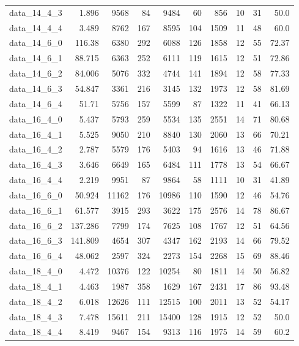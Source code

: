 \begin{tabular}{rrrrrrrrrr}
  data\_14\_4\_3 & 1.896 & 9568 & 84 & 9484 & 60 & 856 & 10 & 31 & 50.0 \\
  data\_14\_4\_4 & 3.489 & 8762 & 167 & 8595 & 104 & 1509 & 11 & 48 & 60.0 \\
  data\_14\_6\_0 & 116.38 & 6380 & 292 & 6088 & 126 & 1858 & 12 & 55 & 72.37 \\
  data\_14\_6\_1 & 88.715 & 6363 & 252 & 6111 & 119 & 1615 & 12 & 51 & 72.86 \\
  data\_14\_6\_2 & 84.006 & 5076 & 332 & 4744 & 141 & 1894 & 12 & 58 & 77.33 \\
  data\_14\_6\_3 & 54.847 & 3361 & 216 & 3145 & 132 & 1973 & 12 & 58 & 81.69 \\
  data\_14\_6\_4 & 51.71 & 5756 & 157 & 5599 & 87 & 1322 & 11 & 41 & 66.13 \\
  data\_16\_4\_0 & 5.437 & 5793 & 259 & 5534 & 135 & 2551 & 14 & 71 & 80.68 \\
  data\_16\_4\_1 & 5.525 & 9050 & 210 & 8840 & 130 & 2060 & 13 & 66 & 70.21 \\
  data\_16\_4\_2 & 2.787 & 5579 & 176 & 5403 & 94 & 1616 & 13 & 46 & 71.88 \\
  data\_16\_4\_3 & 3.646 & 6649 & 165 & 6484 & 111 & 1778 & 13 & 54 & 66.67 \\
  data\_16\_4\_4 & 2.219 & 9951 & 87 & 9864 & 58 & 1111 & 10 & 31 & 41.89 \\
  data\_16\_6\_0 & 50.924 & 11162 & 176 & 10986 & 110 & 1590 & 12 & 46 & 54.76 \\
  data\_16\_6\_1 & 61.577 & 3915 & 293 & 3622 & 175 & 2576 & 14 & 78 & 86.67 \\
  data\_16\_6\_2 & 137.286 & 7799 & 174 & 7625 & 108 & 1767 & 12 & 51 & 64.56 \\
  data\_16\_6\_3 & 141.809 & 4654 & 307 & 4347 & 162 & 2193 & 14 & 66 & 79.52 \\
  data\_16\_6\_4 & 48.062 & 2597 & 324 & 2273 & 154 & 2268 & 15 & 69 & 88.46 \\
  data\_18\_4\_0 & 4.472 & 10376 & 122 & 10254 & 80 & 1811 & 14 & 50 & 56.82 \\
  data\_18\_4\_1 & 4.463 & 1987 & 358 & 1629 & 167 & 2431 & 17 & 86 & 93.48 \\
  data\_18\_4\_2 & 6.018 & 12626 & 111 & 12515 & 100 & 2011 & 13 & 52 & 54.17 \\
  data\_18\_4\_3 & 7.478 & 15611 & 211 & 15400 & 128 & 1915 & 12 & 52 & 50.0 \\
  data\_18\_4\_4 & 8.419 & 9467 & 154 & 9313 & 116 & 1975 & 14 & 59 & 60.2 \\

\end{tabular}
